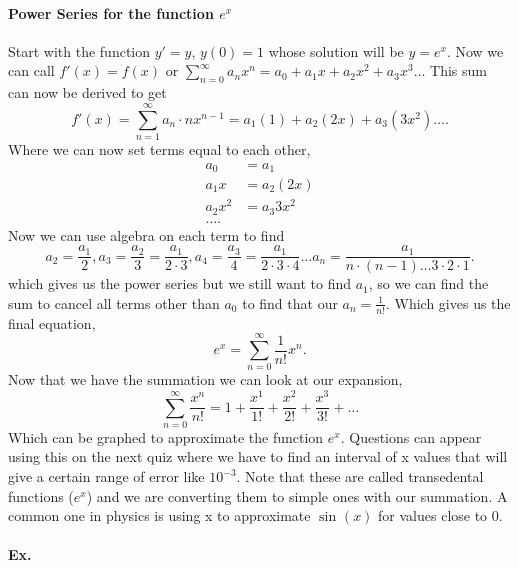 \paragraph{Power Series for the function $ e^{ x } $ \\}
Start with the function $ y' = y\text{, } y\left( 0 \right) =1 $ whose solution will be $ y=e^{ x } $. Now we can call $ f'\left( x \right) = f\left( x \right)  $ or $ \sum_{ n=0 } ^{ \infty } a_nx^{ n } = a_{ 0 }+a_1x + a_2x^2 + a_3x^3 \ldots$ This sum can now be derived to get 
\[
f'\left( x \right) = \sum_{ n=1 } ^{ \infty } a_n \cdot nx^{ n-1 }= a_1\left( 1 \right) +a_2\left( 2x \right) +a_3\left( 3x^2 \right) \ldots
.\] 
Where we can now set terms equal to each other,
\begin{align*}
a_0 &= a_1 \\
a_1x &=  a_2\left( 2x \right)  \\
a_2x^2 &= a_3 3x^2 \\
\ldots
.\end{align*}
Now we can use algebra on each term to find
\[
a_2 = \frac{ a_1 }{ 2 }, a_3 = \frac{ a_2 }{ 3 } = \frac{ a_1 }{ 2\cdot 3 }, a_4 = \frac{ a_3 }{ 4 } = \frac{ a_1 }{ 2\cdot 3\cdot 4 } \ldots a_n = \frac{ a_1 }{ n\cdot \left( n-1 \right) \ldots 3 \cdot 2\cdot 1 }
.\] 
which gives us the power series but we still want to find $ a_1 $, so we can find the sum to cancel all terms other than $ a_0 $ to find that our $ a_n = \frac{ 1 }{ n! }  $. Which gives us the final equation,
\[
e^{ x }= \sum_{ n=0 } ^{ \infty } \frac{ 1 }{ n! } x^{ n }
.\] 
Now that we have the summation we can look at our expansion, 
\[
\sum_{ n=0 } ^{ \infty } \frac{ x^{ n } }{ n! }= 1 + \frac{ x^{ 1 } }{ 1! }+ \frac{ x^{ 2 } }{ 2! }+ \frac{ x^{ 3 } }{ 3! }+ \ldots
\] 
Which can be graphed to approximate the function $ e^{ x } $. Questions can appear using this on the next quiz where we have to find an interval of x values that will give a certain range of error like $ 10^{ -3 } $. Note that these are called transedental functions ($ e^{ x }$) and we are converting them to simple ones with our summation. A common one in physics is using x to approximate $ \sin^{  } \left( x \right)  $ for values close to 0. 

\paragraph{Ex.}
